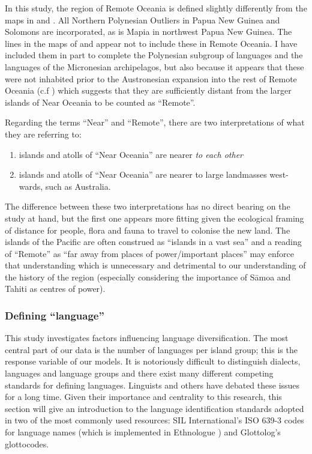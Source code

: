 \documentclass[12pt,letterpaper]{article}
\begin{document}
In this study, the region of Remote Oceania is defined slightly differently from the maps in \citet{green1991near} and \citet{pawley2007locatingoceanic}. All Northern Polynesian Outliers in Papua New Guinea and Solomons are incorporated, as is Mapia in northwest Papua New Guinea. The lines in the maps of \citet{green1991near} and \citet{pawley2007locatingoceanic} appear not to include these in Remote Oceania. I have included them in part to complete the Polynesian subgroup of languages and the languages of the Micronesian archipelagos, but also because it appears that these were not inhabited prior to the Austronesian expansion into the rest of Remote Oceania (c.f \citet[23]{kirch2012basline}) which suggests that they are sufficiently distant from the larger islands of Near Oceania to be counted as ``Remote''.

Regarding the terms ``Near'' and ``Remote'', there are two interpretations of what they are referring to:

\begin{enumerate}
    \item islands and atolls of ``Near Oceania'' are nearer \emph{to each other} 
    \item islands and atolls of ``Near Oceania'' are nearer to large landmasses west-wards, such as Australia.
\end{enumerate}

The difference between these two interpretations has no direct bearing on the study at hand, but the first one appears more fitting given the ecological framing of distance for people, flora and fauna to travel to colonise the new land. The islands of the Pacific are often construed as ``islands in a vast sea'' \citep{hauofa_1993} and a reading of ``Remote'' as ``far away from places of power/important places'' may enforce that understanding which is unnecessary and detrimental to our understanding of the history of the region (especially considering the importance of S\={a}moa and Tahiti as centres of power). 

\newpage
\FloatBarrier
\subsubsection{Defining ``language''}
\label{sec:language_class}
This study investigates factors influencing language diversification. The most central part of our data is the number of languages per island group; this is the response variable of our models. It is notoriously difficult to distinguish dialects, languages and language groups and there exist many different competing standards for defining languages. Linguists and others have debated these issues for a long time. Given their importance and centrality to this research, this section will give an introduction to the language identification standards adopted in two of the most commonly used resources: SIL International's ISO 639-3 codes for language names (which is implemented in Ethnologue \citep{ethnologue22}) and Glottolog's glottocodes.
\end{document}
